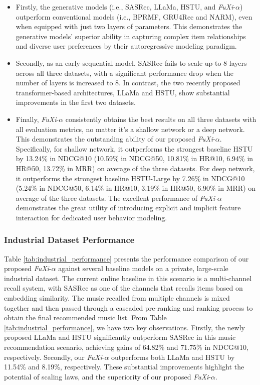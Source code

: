 \begin{itemize}[leftmargin=*,align=left]
    \item Firstly, the generative models (i.e., SASRec, LLaMa, HSTU, and \textit{FuXi}-$\alpha$) outperform conventional models (i.e., BPRMF, GRU4Rec and NARM), 
    even when equipped with just two layers of parameters.
    This demonstrates the generative models' superior ability in capturing complex item relationships and diverse user preferences by their autoregressive modeling paradigm.
    
    \item Secondly, as an early sequential model, SASRec fails to scale up to 8 layers across all three datasets, with a significant performance drop when the number of layers is increased to 8.
    In contrast, the two recently proposed transformer-based architectures, LLaMa and HSTU, show substantial improvements in the first two datasets.
  
    \item Finally, \textit{FuXi}-$\alpha$ consistently obtains the best results on all three datasets with all evaluation metrics, no matter it's a shallow network or a deep network.
    This demonstrates the outstanding ability of our proposed \textit{FuXi}-$\alpha$.
    Specifically, for shallow network, it outperforms the strongest baseline HSTU by 13.24\% in NDCG@10 (10.59\% in NDCG@50, 10.81\% in HR@10, 6.94\% in HR@50, 13.72\% in MRR) on average of the three datasets.
    For deep network, it outperforms the strongest baseline HSTU-Large by 7.26\% in NDCG@10 (5.24\% in NDCG@50, 6.14\% in HR@10, 3.19\% in HR@50, 6.90\% in MRR) on average of the three datasets.
    The excellent performance of \textit{FuXi}-$\alpha$ demonstrates the great utility of introducing explicit and implicit feature interaction for dedicated user behavior modeling.

\end{itemize}

\subsubsection{Industrial Dataset Performance}
Table \ref{tab:industrial_performance} presents the performance comparison of our proposed \textit{FuXi}-$\alpha$ against several baseline models on a private, large-scale industrial dataset.
The current online baseline in this scenario is a multi-channel recall system, with SASRec as one of the channels that recalls items based on embedding similarity. 
The music recalled from multiple channels is mixed together and then passed through a cascaded pre-ranking and ranking process to obtain the final recommended music list.
From Table \ref{tab:industrial_performance}, we have two key observations.
Firstly, the newly proposed LLaMa and HSTU significantly outperform SASRec in this music recommendation scenario, achieving gains of 64.82\% and 71.75\% in NDCG@10, respectively.
Secondly, our \textit{FuXi}-$\alpha$ outperforms both LLaMa and HSTU by 11.54\% and 8.19\%, respectively.
These substantial improvements highlight the potential of scaling laws, and the superiority of our proposed \textit{FuXi}-$\alpha$.

